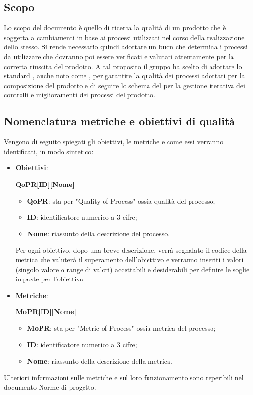 \documentclass[../piano-di-qualifica.tex]{subfiles}
\begin{document}
\subsection{Scopo}%
\label{sub:scopo}
Lo scopo del documento è quello di ricerca la qualità di un prodotto che è soggetta a cambiamenti in base ai processi utilizzati nel corso della realizzazione dello stesso.
Si rende necessario quindi adottare un buon  che determina i processi da utilizzare che dovranno poi essere verificati e valutati attentamente per la corretta riuscita del prodotto.
A tal proposito il gruppo ha scelto di adottare lo standard , anche noto come , per garantire la qualità dei processi adottati per la composizione del prodotto e di seguire lo schema del  per la gestione iterativa dei controlli e miglioramenti dei processi del prodotto.

\subsection{Nomenclatura metriche e obiettivi di qualità}%
\label{sub:nomenclatura_metriche_e_obiettivi_di_qualita}
Vengono di seguito spiegati gli obiettivi, le metriche e come essi verranno identificati, in modo sintetico:
\begin{itemize}
    \item \textbf{Obiettivi}: 
    \begin{center}
        \centering
        \textbf{QoPR[ID][Nome]}
    \end{center}
        \begin{itemize}
            \item \textbf{QoPR}: sta per "Quality of Process" ossia qualità del processo;
            \item \textbf{ID}: identificatore numerico a 3 cifre;
            \item \textbf{Nome}: riassunto della descrizione del processo.
        \end{itemize}
        Per ogni obiettivo, dopo una breve descrizione, verrà segnalato il codice della metrica che valuterà il superamento dell'obiettivo e verranno inseriti i valori (singolo valore o range di valori) accettabili e desiderabili per definire le soglie imposte per l'obiettivo.
    \item \textbf{Metriche}: 
    \begin{center}
        \centering
        \textbf{MoPR[ID][Nome]}
    \end{center}
        \begin{itemize}
            \item \textbf{MoPR}: sta per "Metric of Process" ossia metrica del processo;
            \item \textbf{ID}: identificatore numerico a 3 cifre;
            \item \textbf{Nome}: riassunto della descrizione della metrica.
        \end{itemize}
\end{itemize}  
Ulteriori informazioni sulle metriche e sul loro funzionamento sono reperibili nel documento Norme di progetto.
\end{document}
